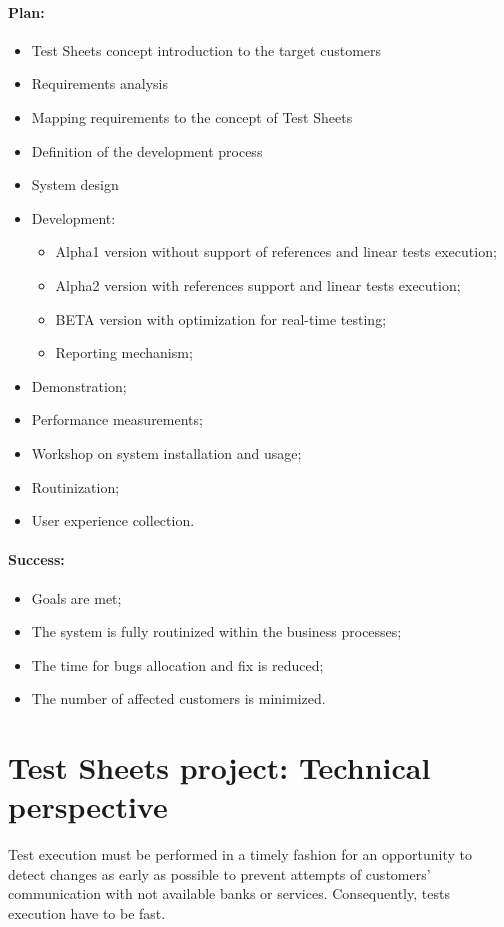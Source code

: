 \paragraph{Plan:}
\begin{itemize}
	\item Test Sheets concept introduction to the target customers
	\item Requirements analysis 
	\item Mapping requirements to the concept of Test Sheets
	\item Definition of the development process
	\item System design
	\item Development:
	\begin{itemize}
		\item Alpha1 version without support of references and linear tests execution;
		\item Alpha2 version with references support and linear tests execution;
		\item BETA version with optimization for real-time testing;
		\item Reporting mechanism;
	\end{itemize}
	\item Demonstration;
	\item Performance measurements;
	\item Workshop on system installation and usage;
	\item Routinization;
	\item User experience collection.
\end{itemize}

\paragraph{Success:}
\begin{itemize}
	\item Goals are met;
	\item The system is fully routinized within the business processes;
	\item The time for bugs allocation and fix is reduced;
	\item The number of affected customers is minimized.
\end{itemize}


\section{Test Sheets project: Technical perspective}
Test execution must be performed in a timely fashion for an opportunity to detect changes as early as possible to prevent attempts of customers' communication with not available banks or services. Consequently, tests execution have to be fast.


